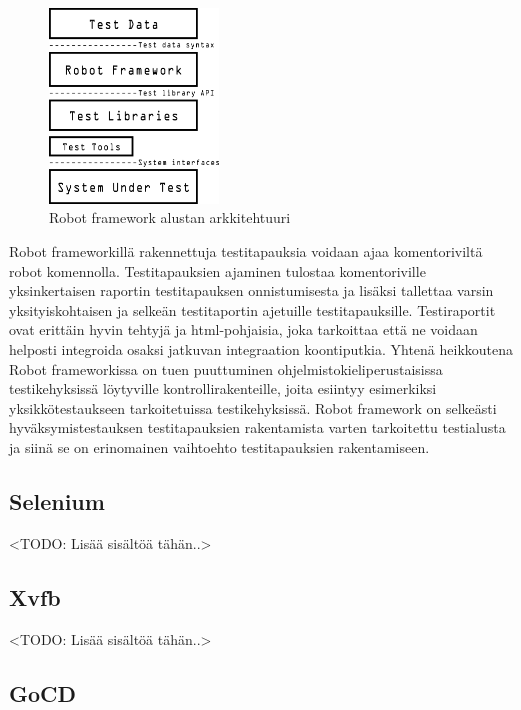     \begin{figure}[H]
      \centering
      \includegraphics[width=0.4\textwidth]{assets/robot-arkkitehtuuri.png}
      \caption{Robot framework alustan arkkitehtuuri}
      \label{fig:robot-architecture}
    \end{figure}

    Robot frameworkillä rakennettuja testitapauksia voidaan ajaa komentoriviltä robot komennolla.
    Testitapauksien ajaminen tulostaa komentoriville yksinkertaisen raportin testitapauksen onnistumisesta ja lisäksi tallettaa varsin yksityiskohtaisen ja selkeän testitaportin ajetuille testitapauksille.
    Testiraportit ovat erittäin hyvin tehtyjä ja html-pohjaisia, joka tarkoittaa että ne voidaan helposti integroida osaksi jatkuvan integraation koontiputkia.
    Yhtenä heikkoutena Robot frameworkissa on tuen puuttuminen ohjelmistokieliperustaisissa testikehyksissä löytyville kontrollirakenteille, joita esiintyy esimerkiksi yksikkötestaukseen tarkoitetuissa testikehyksissä.
    Robot framework on selkeästi hyväksymistestauksen testitapauksien rakentamista varten tarkoitettu testialusta ja siinä se on erinomainen vaihtoehto testitapauksien rakentamiseen.

  \subsection{Selenium} \label{ch:08_selenium}

    <TODO: Lisää sisältöä tähän..>

  \subsection{Xvfb} \label{ch:08_xvfb}

    <TODO: Lisää sisältöä tähän..>

  \subsection{GoCD} \label{ch:08_gocd}

